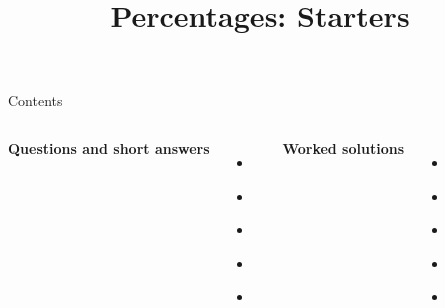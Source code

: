 \documentclass{beamer}
\title{Percentages: Starters}
\author{}
\date{}
\begin{document}
\frame{\titlepage}

\begin{frame}{Contents}
\small
\begin{columns}[T]
\textbf{Questions and short answers}
\begin{itemize}
  \item \hyperlink{q-st1}{}
  \item \hyperlink{q-st2}{}
  \item \hyperlink{q-st3}{}
  \item \hyperlink{q-st4}{}
  \item \hyperlink{q-st5}{}
\end{itemize}

\textbf{Worked solutions}
\begin{itemize}
  \item \hyperlink{work-st1}{}
  \item \hyperlink{work-st2}{}
  \item \hyperlink{work-st3}{}
  \item \hyperlink{work-st4}{}
  \item \hyperlink{work-st5}{}
\end{itemize}
\end{columns}
\end{frame}
\end{document}
